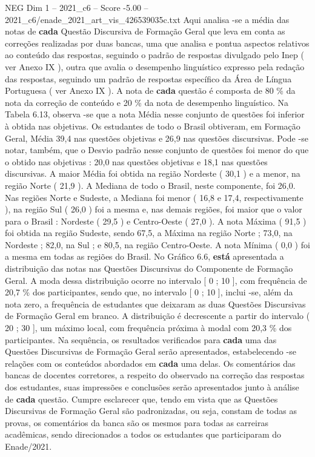 \begin{textsample}{NEG Dim 1 – 2021\_c6 – Score -5.00 – 2021\_c6/enade\_2021\_art\_vis\_426539035c.txt}
Aqui analisa -se a média das notas de \textbf{cada} Questão Discursiva de Formação Geral que leva em conta as correções realizadas por duas bancas, uma que analisa e pontua aspectos relativos ao conteúdo das respostas, seguindo o padrão de respostas divulgado pelo Inep ( ver Anexo IX ), outra que avalia o desempenho linguístico expresso pela redação das respostas, seguindo um padrão de respostas específico da Área de Língua Portuguesa ( ver Anexo IX ).
A nota de \textbf{cada} questão é composta de 80 \% da nota da correção de conteúdo e 20 \% da nota de desempenho linguístico.
Na Tabela 6.13, observa -se que a nota Média nesse conjunto de questões foi inferior à obtida nas objetivas.
Os estudantes de todo o Brasil obtiveram, em Formação Geral, Média 39,4 nas questões objetivas e 26,9 nas questões discursivas.
Pode -se notar, também, que o Desvio padrão nesse conjunto de questões foi menor do que o obtido nas objetivas : 20,0 nas questões objetivas e 18,1 nas questões discursivas.
A maior Média foi obtida na região Nordeste ( 30,1 ) e a menor, na região Norte ( 21,9 ).
A Mediana de todo o Brasil, neste componente, foi 26,0.
Nas regiões Norte e Sudeste, a Mediana foi menor ( 16,8 e 17,4, respectivamente ), na região Sul ( 26,0 ) foi a mesma e, nas demais regiões, foi maior que o valor para o Brasil : Nordeste ( 29,5 ) e Centro-Oeste ( 27,0 ).
A nota Máxima ( 91,5 ) foi obtida na região Sudeste, sendo 67,5, a Máxima na região Norte ; 73,0, na Nordeste ; 82,0, na Sul ; e 80,5, na região Centro-Oeste.
A nota Mínima ( 0,0 ) foi a mesma em todas as regiões do Brasil.
No Gráfico 6.6, \textbf{está} apresentada a distribuição das notas nas Questões Discursivas do Componente de Formação Geral.
A moda dessa distribuição ocorre no intervalo [ 0 ; 10 ], com frequência de 20,7 \% dos participantes, sendo que, no intervalo [ 0 ; 10 ], inclui -se, além da nota zero, a frequência de estudantes que deixaram as duas Questões Discursivas de Formação Geral em branco.
A distribuição é decrescente a partir do intervalo ( 20 ; 30 ], um máximo local, com frequência próxima à modal com 20,3 \% dos participantes.
Na sequência, os resultados verificados para \textbf{cada} uma das Questões Discursivas de Formação Geral serão apresentados, estabelecendo -se relações com os conteúdos abordados em \textbf{cada} uma delas.
Os comentários das bancas de docentes corretores, a respeito do observado na correção das respostas dos estudantes, suas impressões e conclusões serão apresentados junto à análise de \textbf{cada} questão.
Cumpre esclarecer que, tendo em vista que as Questões Discursivas de Formação Geral são padronizadas, ou seja, constam de todas as provas, os comentários da banca são os mesmos para todas as carreiras acadêmicas, sendo direcionados a todos os estudantes que participaram do Enade/2021.

\end{textsample}
